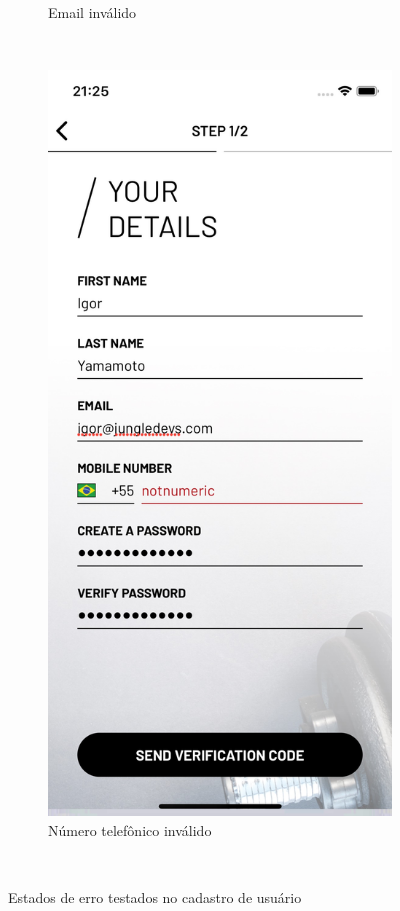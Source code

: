 \begin{figure}[H]
\begin{subfigure}[b]{0.4\textwidth}
        \caption{Email inválido}
        \label{fig:email-not-valid-field}
    \end{subfigure}
    ~
	\begin{subfigure}[b]{0.4\textwidth}
        \includegraphics[width=\textwidth]{pfc/figuras/phone-not-valid-field.png}
        \caption{Número telefônico inválido}
        \label{fig:phone-not-valid-field}
    \end{subfigure}
    ~
    \caption{Estados de erro testados no cadastro de usuário}
    \label{fig:error-states-test}
\end{figure}

